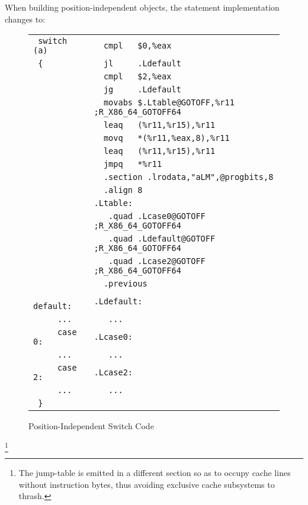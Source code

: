 When building position-independent objects, the 
statement implementation changes to:

\begin{figure}[H]
\Hrule
\caption{Position-Independent Switch Code}\label{large_pic_switch}
\begin{footnotesize}
\begin{tabular}{|l|l|}
\hline
\verb# switch (a)  # & \verb#  cmpl   $0,%eax              # \\
\verb# {           # & \verb#  jl     .Ldefault            # \\
\verb#             # & \verb#  cmpl   $2,%eax              # \\
\verb#             # & \verb#  jg     .Ldefault            # \\
\verb#             # & \verb#  movabs $.Ltable@GOTOFF,%r11 ;R_X86_64_GOTOFF64#\\
\verb#             # & \verb#  leaq   (%r11,%r15),%r11     # \\
\verb#             # & \verb#  movq   *(%r11,%eax,8),%r11  # \\
\verb#             # & \verb#  leaq   (%r11,%r15),%r11     # \\
\verb#             # & \verb#  jmpq   *%r11                # \\
\verb#             # & \verb#  .section .lrodata,"aLM",@progbits,8 # \\
\verb#             # & \verb#  .align 8                      # \\
\verb#             # & \verb#.Ltable:                        # \\
\verb#             # & \verb#   .quad .Lcase0@GOTOFF       ;R_X86_64_GOTOFF64#\\
\verb#             # & \verb#   .quad .Ldefault@GOTOFF     ;R_X86_64_GOTOFF64#\\
\verb#             # & \verb#   .quad .Lcase2@GOTOFF       ;R_X86_64_GOTOFF64#\\
\verb#             # & \verb#  .previous               # \\
\verb#     default:# & \verb#.Ldefault:                       # \\
\verb#     ...     # & \verb#   ...                           # \\
\verb#     case 0: # & \verb#.Lcase0:                         # \\
\verb#     ...     # & \verb#   ...                           # \\
\verb#     case 2: # & \verb#.Lcase2:                         # \\
\verb#     ...     # & \verb#   ...                           # \\
\verb# }           # & \verb#                                 # \\
\hline
\end{tabular}
\end{footnotesize}
\end{figure}\footnote{The
jump-table is emitted in a different section so as to occupy cache lines
without instruction bytes, thus avoiding exclusive cache
subsystems to thrash.}

